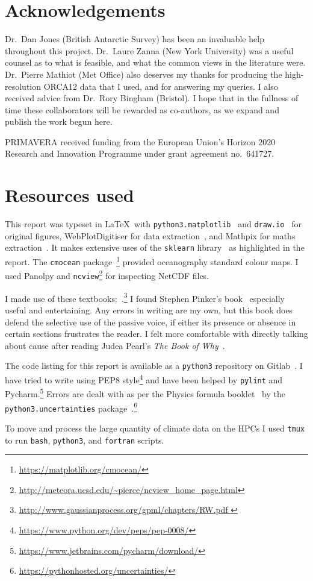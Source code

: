 \section{Acknowledgements}
Dr.\ Dan Jones (British Antarctic Survey) has been an invaluable help throughout this project.
Dr.\ Laure Zanna (New York University) was a useful counsel as to what is feasible,
 and what the common views in the literature were.
Dr.\ Pierre Mathiot (Met Office) also deserves my thanks for
producing the high-resolution ORCA12 data that I used, and
for answering my queries.
I also received advice from Dr.\ Rory Bingham (Bristol).
I hope that in the fullness of time these collaborators will be rewarded
as co-authors, as we expand and publish the
work begun here.

PRIMAVERA received funding from the European Union's Horizon 2020
Research and Innovation Programme under grant agreement no.~641727.


\section{Resources used}

This report was typeset in \LaTeX\
with \texttt{python3.matplotlib}~\cite{Hunter:2007} and \texttt{draw.io}~\cite{DrawIO}
for original figures, WebPlotDigitiser for data extraction~\cite{WebPlotDigitiser},
and Mathpix for maths extraction~\cite{mathpix}.
It makes extensive uses of the \texttt{sklearn} library~\cite{scikit-learn} as highlighted in the report.
The \texttt{cmocean} package~\cite{thyng2016true}\footnote{\url{https://matplotlib.org/cmocean/}}
provided oceanography standard colour maps.
I used Panolpy and \texttt{ncview}\footnote{\url{http://meteora.ucsd.edu/~pierce/ncview_home_page.html}}
for inspecting NetCDF files.

I made use of these textbooks:~\cite{roisin2010GFD,williams2011ocean,ITILA,
sivia2006data,williams2006gaussian,
}.\footnote{\url{http://www.gaussianprocess.org/gpml/chapters/RW.pdf
}}
I found Stephen Pinker's book~\cite{pinker2015sense} especially useful and entertaining.
Any errors in writing are my own, but this book does defend the selective use of the
passive voice, if either its presence or absence in certain sections frustrates the reader.
I felt more comfortable with directly talking about cause after reading
Judea Pearl's \textit{The Book of Why}~\cite{pearl2018book}.

The code listing for this report is available as a \texttt{python3} repository on Gitlab~\cite{gitlab, skextremes}.
 I have tried to write using PEP8 style\footnote{\url{https://www.python.org/dev/peps/pep-0008/}}
 and have been helped by \texttt{pylint} and Pycharm.\footnote{\url{https://www.jetbrains.com/pycharm/download/}}
 Errors are dealt with as per the Physics formula booklet~\cite{MathsFormulaBooklet}
 by the \texttt{python3.uncertainties}
 package~\cite{lebigot2010uncertainties}.\footnote{\url{https://pythonhosted.org/uncertainties/}}

 To move and process the large quantity of climate data on the HPCs I used \texttt{tmux}
 to run \texttt{bash}, \texttt{python3}, and \texttt{fortran} scripts.
